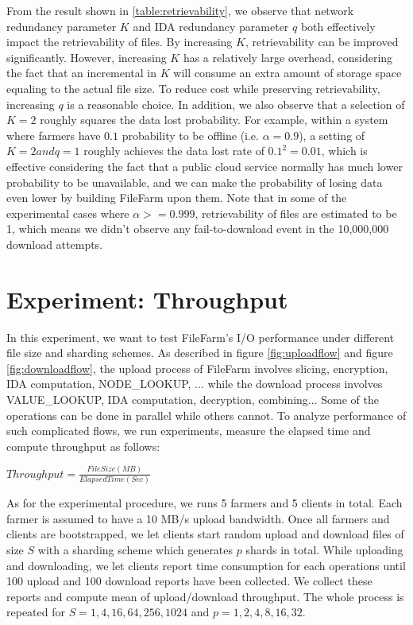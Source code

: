 From the result shown in \ref{table:retrievability}, we observe that network redundancy parameter $K$ and IDA redundancy parameter $q$ both effectively impact the retrievability of files. By increasing $K$, retrievability can be improved significantly. However, increasing $K$ has a relatively large overhead, considering the fact that an incremental in $K$ will consume an extra amount of storage space equaling to the actual file size. To reduce cost while preserving retrievability, increasing $q$ is a reasonable choice. In addition, we also observe that a selection of $K=2$ roughly squares the data lost probability. For example, within a system where farmers have $0.1$ probability to be offline (i.e. $\alpha=0.9$), a setting of $K=2 and q=1$ roughly achieves the data lost rate of $0.1^{2}=0.01$, which is effective considering the fact that a public cloud service normally has much lower probability to be unavailable, and we can make the probability of losing data even lower by building FileFarm upon them. Note that in some of the experimental cases where $\alpha>=0.999$, retrievability of files are estimated to be 1, which means we didn't observe any fail-to-download event in the 10,000,000 download attempts.

\section{Experiment: Throughput}
\label{s:expthroughput}

In this experiment, we want to test FileFarm's I/O performance under different file size and sharding schemes. As described in figure \ref{fig:uploadflow} and figure \ref{fig:downloadflow}, the upload process of FileFarm involves slicing, encryption, IDA computation, NODE\_LOOKUP, ... while the download process involves VALUE\_LOOKUP, IDA computation, decryption, combining... Some of the operations can be done in parallel while others cannot. To analyze performance of such complicated flows, we run experiments, measure the elapsed time and compute throughput as follows:

\begin{center}
  $Throughput = \frac{File Size(MB)}{Elapsed Time(Sec)}$
\end{center}

As for the experimental procedure, we runs 5 farmers and 5 clients in total. Each farmer is assumed to have a 10 MB/s upload bandwidth. Once all farmers and clients are bootstrapped, we let clients start random upload and download files of size $S$ with a sharding scheme which generates $p$ shards in total. While uploading and downloading, we let clients report time consumption for each operations until 100 upload and 100 download reports have been collected. We collect these reports and compute mean of upload/download throughput. The whole process is repeated for $S=1,4,16,64,256,1024$ and $p=1,2,4,8,16,32$.

